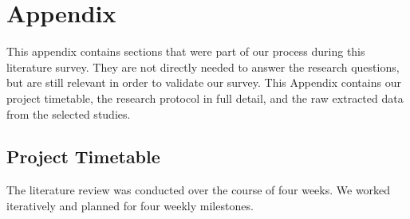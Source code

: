 \documentclass[]{book}
\begin{document}
\section{Appendix}\label{appendix-1}

This appendix contains sections that were part of our process during
this literature survey. They are not directly needed to answer the
research questions, but are still relevant in order to validate our
survey. This Appendix contains our project timetable, the research
protocol in full detail, and the raw extracted data from the selected
studies.

\subsection{Project Timetable}\label{project-timetable}

The literature review was conducted over the course of four weeks. We
worked iteratively and planned for four weekly milestones.
\end{document}
